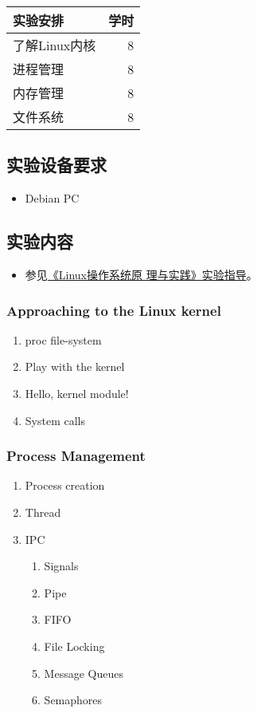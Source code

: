 \documentclass{wx672ctexart}
\begin{document}
\begin{center}
  \begin{tabular}{lr}
    \hline
    实验安排 & 学时\\
    \hline
    了解Linux内核 & 8\\
    进程管理 & 8\\
    内存管理 & 8\\
    文件系统 & 8\\
    \hline
  \end{tabular}
\end{center}

\subsection{实验设备要求}
\label{sec-3-3}

\begin{itemize}
\item Debian PC
\end{itemize}

\subsection{实验内容}
\label{sec-3-4}

\begin{itemize}
\item 参见\href{http://cs6.swfu.edu.cn/~wx672/lecture_notes/os/lab.html}{《Linux操作系统原
    理与实践》实验指导}。
\end{itemize}

\subsubsection{Approaching to the Linux kernel}
\label{sec-3-4-1}

\begin{enumerate}
\item proc file-system
\item Play with the kernel
\item Hello, kernel module!
\item System calls
\end{enumerate}

\subsubsection{Process Management}
\label{sec-3-4-2}

\begin{enumerate}
\item Process creation
\item Thread
\item IPC
  \begin{enumerate}
  \item Signals
  \item Pipe
  \item FIFO
  \item File Locking
  \item Message Queues
  \item Semaphores
  \end{enumerate}
\end{enumerate}
\end{document}
